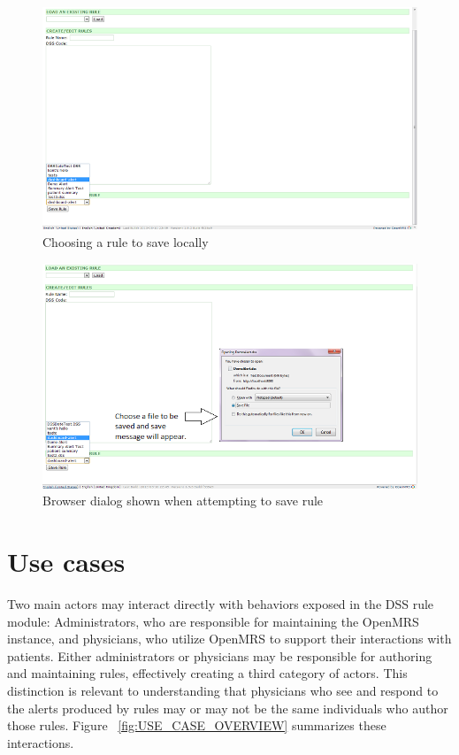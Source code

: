 \documentclass[12pt,letterpaper]{article}
\begin{document}
\begin{figure}[htbp]
\begin{center}
\includegraphics[width=6.5in]{user_guide/save_rule.png}
\end{center}
\caption{Choosing a rule to save locally}
\label{fig:SAVE_RULE}
\end{figure}

\begin{figure}[htbp]
\begin{center}
\includegraphics[width=6.5in]{user_guide/save_rule_dialog.png}
\end{center}
\caption{Browser dialog shown when attempting to save rule}
\label{fig:SAVE_RULE_DIALOG}
\end{figure}

\newpage 
\section{Use cases} \label{sec:USE_CASES}

Two main actors may interact directly with behaviors exposed in the 
DSS rule module: Administrators, who are responsible for maintaining 
the OpenMRS instance, and physicians, who utilize OpenMRS to 
support their interactions with patients. Either administrators 
or physicians may be responsible for authoring and maintaining 
rules, effectively creating a third category of actors. This 
distinction is relevant to understanding that physicians who see 
and respond to the alerts produced by rules may or may not be the 
same individuals who author those rules. Figure ~\ref{fig:USE_CASE_OVERVIEW} summarizes these interactions.
\end{document}
